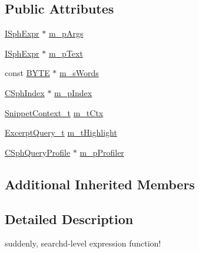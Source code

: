 \subsection*{Public Attributes}
\begin{DoxyCompactItemize}
\item 
\hyperlink{structISphExpr}{I\-Sph\-Expr} $\ast$ \hyperlink{structExpr__Snippet__c_a8fc4d32f9b2e8d9ccb8d1bcc37174f5c}{m\-\_\-p\-Args}
\item 
\hyperlink{structISphExpr}{I\-Sph\-Expr} $\ast$ \hyperlink{structExpr__Snippet__c_adcc5192bd304658af0e96ed639833487}{m\-\_\-p\-Text}
\item 
const \hyperlink{sphinxstd_8h_a4ae1dab0fb4b072a66584546209e7d58}{B\-Y\-T\-E} $\ast$ \hyperlink{structExpr__Snippet__c_aaa6419d695ac0d9758296ee2b5c73d1b}{m\-\_\-s\-Words}
\item 
\hyperlink{classCSphIndex}{C\-Sph\-Index} $\ast$ \hyperlink{structExpr__Snippet__c_acecd8bf3ad556f6dc8276b591f2f8a46}{m\-\_\-p\-Index}
\item 
\hyperlink{classSnippetContext__t}{Snippet\-Context\-\_\-t} \hyperlink{structExpr__Snippet__c_aed59c73c2cc2df70ea24c335cdfe5d80}{m\-\_\-t\-Ctx}
\item 
\hyperlink{structExcerptQuery__t}{Excerpt\-Query\-\_\-t} \hyperlink{structExpr__Snippet__c_a17e42a66852f03a5a8de2bb1ed6787dc}{m\-\_\-t\-Highlight}
\item 
\hyperlink{classCSphQueryProfile}{C\-Sph\-Query\-Profile} $\ast$ \hyperlink{structExpr__Snippet__c_ad8ac9e8e22afbeba444e5d41ad8ac9e6}{m\-\_\-p\-Profiler}
\end{DoxyCompactItemize}
\subsection*{Additional Inherited Members}


\subsection{Detailed Description}
suddenly, searchd-\/level expression function! 

